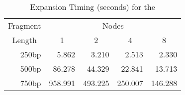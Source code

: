 \begin{table}[bth]
\caption{Expansion Timing (seconds) for the \gamma}
\label{'gamma1'}
\begin{center}
\begin{tabular}{||r|rrrr||}  \hline
\multicolumn{1}{||c|}{Fragment} & \multicolumn{4}{c||}{Nodes} \\ 
\multicolumn{1}{||c|}{Length} & \multicolumn{1}{c}{1} & \multicolumn{1}{c}{2} &
\multicolumn{1}{c}{4} & \multicolumn{1}{c||}{8} \\ \hline
250bp &   5.862 &   3.210 &   2.513 &   2.330 \\
500bp &  86.278 &  44.329 &  22.841 &  13.713 \\
750bp & 958.991 & 493.225 & 250.007 & 146.288 \\ \hline
\end{tabular}
\end{center}
\end{table}
